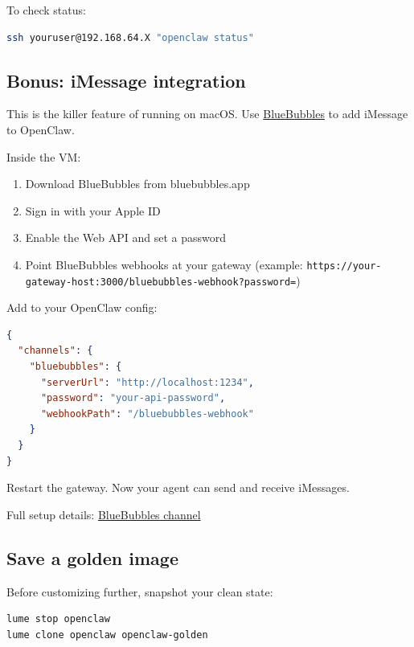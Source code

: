 To check status:

\begin{lstlisting}[language=bash]
ssh youruser@192.168.64.X "openclaw status"
\end{lstlisting}


\hrulefill


\subsection{Bonus: iMessage integration}


This is the killer feature of running on macOS. Use \href{https://bluebubbles.app}{BlueBubbles} to add iMessage to OpenClaw.

Inside the VM:

\begin{enumerate}
  \item Download BlueBubbles from bluebubbles.app
  \item Sign in with your Apple ID
  \item Enable the Web API and set a password
  \item Point BlueBubbles webhooks at your gateway (example: \texttt{https://your-gateway-host:3000/bluebubbles-webhook?password=})
\end{enumerate}


Add to your OpenClaw config:

\begin{lstlisting}[language=json]
{
  "channels": {
    "bluebubbles": {
      "serverUrl": "http://localhost:1234",
      "password": "your-api-password",
      "webhookPath": "/bluebubbles-webhook"
    }
  }
}
\end{lstlisting}


Restart the gateway. Now your agent can send and receive iMessages.

Full setup details: \href{/channels/bluebubbles}{BlueBubbles channel}

\hrulefill


\subsection{Save a golden image}


Before customizing further, snapshot your clean state:

\begin{lstlisting}[language=bash]
lume stop openclaw
lume clone openclaw openclaw-golden
\end{lstlisting}


